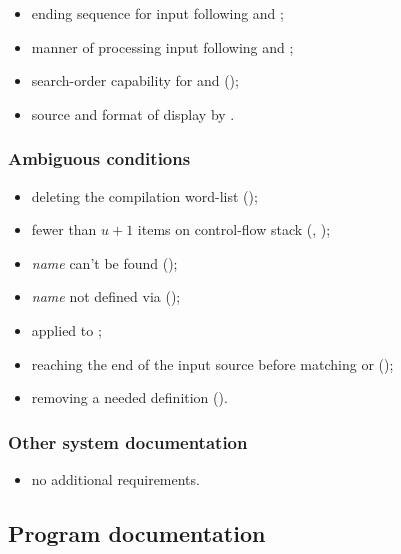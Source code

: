 \begin{itemize}
\item ending sequence for input following
	 and
	;
\item manner of processing input following
	 and
	;
\item search-order capability for
	 and
	();
\item source and format of display by .
\end{itemize}

\subsubsection{Ambiguous conditions} %

\begin{itemize}
\item deleting the compilation word-list ();
\item fewer than $u+1$ items on control-flow stack
	(,
	 );
\item \emph{name} can't be found ();
\item \emph{name} not defined via 
	();
\item {} applied to ;
\item reaching the end of the input source before matching
	 or 
	();
\item removing a needed definition ().
\end{itemize}

\subsubsection{Other system documentation} %

\begin{itemize}
\item no additional requirements.
\end{itemize}

\subsection{Program documentation} %

